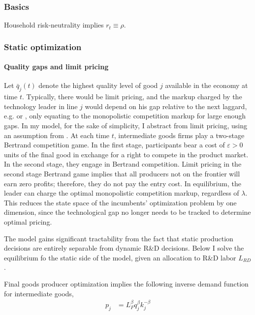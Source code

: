 \documentclass[12pt,english]{article}
\theoremstyle{remark}
\begin{document}
\subsubsection{Basics}

Household risk-neutrality implies $r_t \equiv \rho$.

\subsubsection{Static optimization}

\paragraph{Quality gaps and limit pricing} Let $\bar{q}_j(t)$ denote the highest quality level of good $j$ available in the economy at time $t$. Typically, there would be limit pricing, and the markup charged by the technology leader in line $j$ would depend on his gap relative to the next laggard, e.g. \cite{baslandze_spinout_2019} or \cite{aghion_competition_2005}, only equating to the monopolistic competition markup for large enough gaps. In my model, for the sake of simplicity, I abstract from limit pricing, using an assumption from \cite{akcigit_growth_2018}. At each time $t$, intermediate goods firms play a two-stage Bertrand competition game. In the first stage, participants bear a cost of $\varepsilon > 0$ units of the final good in exchange for a right to compete in the product market. In the second stage, they engage in Bertrand competition. Limit pricing in the second stage Bertrand game implies that all producers not on the frontier will earn zero profits; therefore, they do not pay the entry cost. In equilibrium, the leader can charge the optimal monopolistic competition markup, regardless of $\lambda$. This reduces the state space of the incumbents' optimization problem by one dimension, since the technological gap no longer needs to be tracked to determine optimal pricing.

The model gains significant tractability from the fact that static production decisions are entirely separable from dynamic R\&D decisions. Below I solve the equilibrium fo the static side of the model, given an allocation to R\&D labor $L_{RD}$. 

Final goods producer optimization implies the following inverse demand function for intermediate goods, 
\begin{align*}
p_j &= L_F^{\beta} q_j^{\beta} k_j^{-\beta}	
\end{align*}
\end{document}
